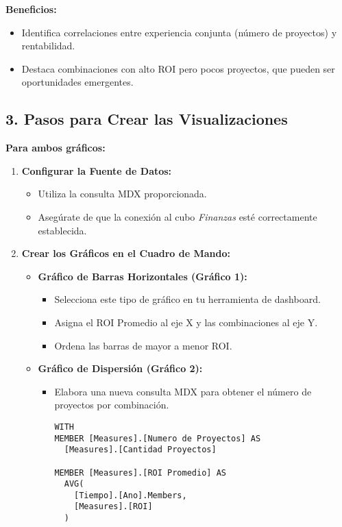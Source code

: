 \documentclass[11pt]{opticajnl}
\begin{document}
\textbf{Beneficios:}

\begin{itemize}
    \item Identifica correlaciones entre experiencia conjunta (número de proyectos) y rentabilidad.
    \item Destaca combinaciones con alto ROI pero pocos proyectos, que pueden ser oportunidades emergentes.
\end{itemize}

\subsection{3. Pasos para Crear las Visualizaciones}

\textbf{Para ambos gráficos:}

\begin{enumerate}
    \item \textbf{Configurar la Fuente de Datos:}
    \begin{itemize}
        \item Utiliza la consulta MDX proporcionada.
        \item Asegúrate de que la conexión al cubo \textit{Finanzas} esté correctamente establecida.
    \end{itemize}
    \item \textbf{Crear los Gráficos en el Cuadro de Mando:}
    \begin{itemize}
        \item \textbf{Gráfico de Barras Horizontales (Gráfico 1):}
        \begin{itemize}
            \item Selecciona este tipo de gráfico en tu herramienta de dashboard.
            \item Asigna el ROI Promedio al eje X y las combinaciones al eje Y.
            \item Ordena las barras de mayor a menor ROI.
        \end{itemize}
        \item \textbf{Gráfico de Dispersión (Gráfico 2):}
        \begin{itemize}
            \item Elabora una nueva consulta MDX para obtener el número de proyectos por combinación.
            \begin{lstlisting}[style=terminal]
WITH 
MEMBER [Measures].[Numero de Proyectos] AS 
  [Measures].[Cantidad Proyectos]

MEMBER [Measures].[ROI Promedio] AS 
  AVG(
    [Tiempo].[Ano].Members,
    [Measures].[ROI]
  )


\end{lstlisting}
\end{itemize}
\end{itemize}
\end{enumerate}
\end{document}
